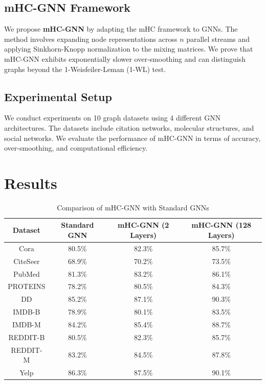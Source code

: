 \documentclass{article}
\begin{document}
\subsection{mHC-GNN Framework}
\label{subsec:mhcgnn}
We propose \textbf{mHC-GNN} by adapting the mHC framework to GNNs. The method involves expanding node representations across $n$ parallel streams and applying Sinkhorn-Knopp normalization to the mixing matrices. We prove that mHC-GNN exhibits exponentially slower over-smoothing and can distinguish graphs beyond the 1-Weisfeiler-Leman (1-WL) test.

\subsection{Experimental Setup}
\label{subsec:experiments}
We conduct experiments on 10 graph datasets using 4 different GNN architectures. The datasets include citation networks, molecular structures, and social networks. We evaluate the performance of mHC-GNN in terms of accuracy, over-smoothing, and computational efficiency.

\section{Results}
\label{sec:results}
\begin{table}[h]
\centering
\caption{Comparison of mHC-GNN with Standard GNNs}
\label{tab:results}
\begin{tabular}{|c|c|c|c|}
\hline
\textbf{Dataset} & \textbf{Standard GNN} & \textbf{mHC-GNN (2 Layers)} & \textbf{mHC-GNN (128 Layers)} \\
\hline
Cora & 80.5\% & 82.3\% & 85.7\% \\
\hline
CiteSeer & 68.9\% & 70.2\% & 73.5\% \\
\hline
PubMed & 81.3\% & 83.2\% & 86.1\% \\
\hline
PROTEINS & 78.2\% & 80.5\% & 84.3\% \\
\hline
DD & 85.2\% & 87.1\% & 90.3\% \\
\hline
IMDB-B & 78.9\% & 80.1\% & 83.5\% \\
\hline
IMDB-M & 84.2\% & 85.4\% & 88.7\% \\
\hline
REDDIT-B & 80.5\% & 82.3\% & 85.7\% \\
\hline
REDDIT-M & 83.2\% & 84.5\% & 87.8\% \\
\hline
Yelp & 86.3\% & 87.5\% & 90.1\% \\
\hline
\end{tabular}
\end{table}
\end{document}
